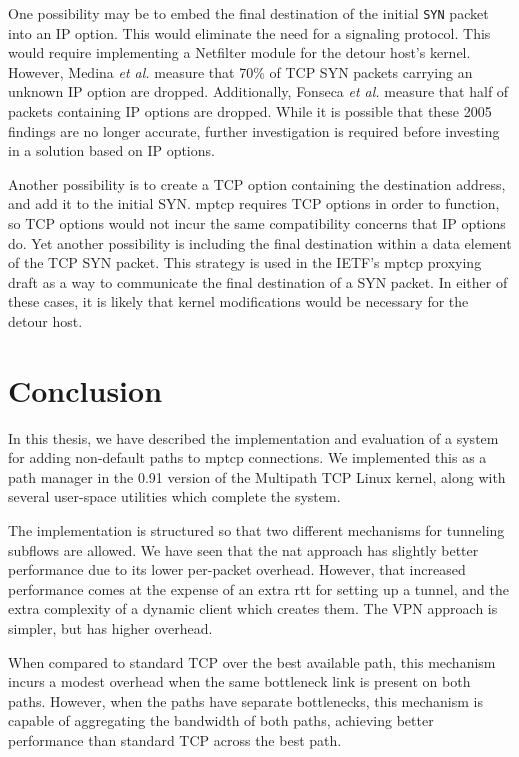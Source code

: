 \documentclass{cwru}
\begin{document}
One possibility may be to embed the final destination of the initial
\texttt{SYN} packet into an IP option. This would eliminate the need for a
signaling protocol. This would require implementing a Netfilter module for the
detour host's kernel. However, Medina \textit{et al.} \cite{medina2005measuring}
measure that 70\% of TCP SYN packets carrying an unknown IP option are dropped.
Additionally, Fonseca \textit{et al.} \cite{fonseca2005ip} measure that half of
packets containing IP options are dropped. While it is possible that these 2005
findings are no longer accurate, further investigation is required before
investing in a solution based on IP options.

Another possibility is to create a TCP option containing the destination
address, and add it to the initial SYN. \ac{mptcp} requires TCP options in order
to function, so TCP options would not incur the same compatibility concerns that
IP options do. Yet another possibility is including the final destination within
a data element of the TCP SYN packet. This strategy is used in the IETF's
\ac{mptcp} proxying draft \cite{boucadair-mptcp-plain-mode-10} as a way to
communicate the final destination of a SYN packet. In either of these cases, it
is likely that kernel modifications would be necessary for the detour host.

\chapter{Conclusion}
\label{c:conclusion}

In this thesis, we have described the implementation and evaluation of a system
for adding non-default paths to \ac{mptcp} connections. We implemented this as a
path manager in the 0.91 version of the Multipath TCP Linux kernel, along with
several user-space utilities which complete the system.

The implementation is structured so that two different mechanisms for tunneling
subflows are allowed. We have seen that the \ac{nat} approach has slightly
better performance due to its lower per-packet overhead. However, that increased
performance comes at the expense of an extra \ac{rtt} for setting up a tunnel,
and the extra complexity of a dynamic client which creates them. The VPN
approach is simpler, but has higher overhead.

When compared to standard TCP over the best available path, this mechanism
incurs a modest overhead when the same bottleneck link is present on both paths.
However, when the paths have separate bottlenecks, this mechanism is capable of
aggregating the bandwidth of both paths, achieving better performance than
standard TCP across the best path.
\end{document}
